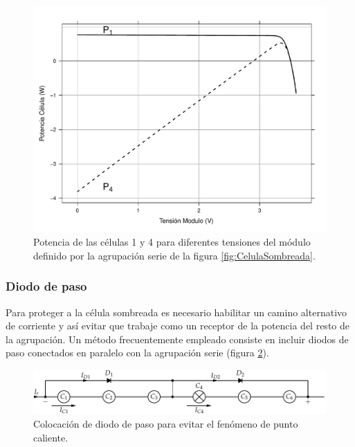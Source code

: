 \begin{figure}
\begin{centering}
\includegraphics[scale=0.5]{../figs/PotenciaCelula_Sombra}
\end{centering}

\caption{Potencia de las células 1 y 4 para diferentes tensiones del módulo
definido por la agrupación serie de la figura \ref{fig:CelulaSombreada}.\label{fig:PotenciaCelulasSombreada}}

\end{figure}


\subsubsection{Diodo de paso}

Para proteger a la célula sombreada es necesario habilitar un camino
alternativo de corriente y así evitar que trabaje como un receptor
de la potencia del resto de la agrupación. Un método frecuentemente
empleado consiste en incluir diodos de paso conectados en paralelo
con la agrupación serie (figura \ref{fig:DiodosPaso}). 


\begin{figure}
\begin{centering}
\includegraphics[scale=0.75]{../figs/AsociacionSerieCelulas_DiodosPaso}
\end{centering}

\caption{Colocación de diodo de paso para evitar el fenómeno de punto caliente.\label{fig:DiodosPaso}}

\end{figure}



